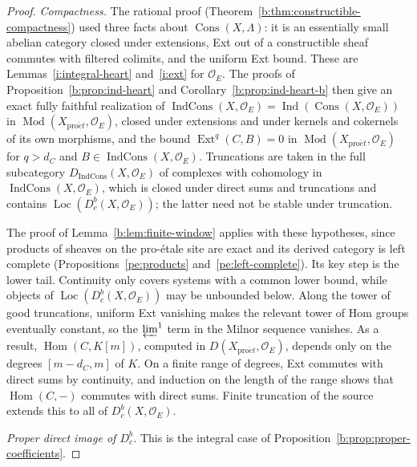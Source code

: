 \documentclass[11pt,a4paper]{article}
\numberwithin{equation}{section}
\theoremstyle{definition}
\theoremstyle{remark}
\newcommand{\Dbc}{D^b_c}
\newcommand{\Mod}{\operatorname{Mod}}
\newcommand{\Loc}{\operatorname{Loc}}
\newcommand{\proet}{\mathrm{pro}\acute{e}t}
\newcommand{\Hom}{\operatorname{Hom}}
\newcommand{\Ext}{\operatorname{Ext}}
\newcommand{\Cons}{\operatorname{Cons}}
\newcommand{\IndCons}{\operatorname{IndCons}}
\newcommand{\Dic}{D_{\IndCons}}
\begin{document}
\begin{proof}
\emph{Compactness.} The rational proof
(Theorem~\ref{b:thm:constructible-compactness}) used three facts about
$\Cons(X,\Lambda)$: it is an essentially small abelian category closed
under extensions, Ext out of a constructible sheaf commutes with
filtered colimits, and the uniform Ext bound. These are
Lemmas~\ref{i:integral-heart} and~\ref{i:ext} for $\mathcal O_E$. The
proofs of Proposition~\ref{b:prop:ind-heart} and
Corollary~\ref{b:prop:ind-heart-b} then give an exact fully faithful
realization of $\IndCons(X,\mathcal O_E)=\operatorname{Ind}(\Cons(X,\mathcal O_E))$
in $\Mod(X_{\proet},\mathcal O_E)$, closed under extensions and under
kernels and cokernels of its own morphisms, and the bound
$\Ext^q(C,B)=0$ in $\Mod(X_{\proet},\mathcal O_E)$ for $q>d_C$ and $B\in\IndCons(X,\mathcal O_E)$. Truncations are taken in the full
subcategory $\Dic(X,\mathcal O_E)$ of complexes with cohomology in
$\IndCons(X,\mathcal O_E)$, which is closed under direct sums and
truncations and contains $\Loc(\Dbc(X,\mathcal O_E))$; the latter need
not be stable under truncation.

The proof of Lemma~\ref{b:lem:finite-window} applies with these
hypotheses, since products of sheaves on the pro-\'etale site are exact
and its derived category is left complete
(Propositions~\ref{pe:products} and~\ref{pe:left-complete}). Its key step
is the lower tail. Continuity only covers systems with a common lower
bound, while objects of $\Loc(\Dbc(X,\mathcal O_E))$ may be unbounded
below. Along the tower of good truncations, uniform Ext vanishing makes
the relevant tower of Hom groups eventually constant, so the
$\varprojlim^1$ term in the Milnor sequence vanishes. As a result,
$\Hom(C,K[m])$, computed in $D(X_{\proet},\mathcal O_E)$, depends only on the degrees $[m-d_C,m]$ of $K$. On a
finite range of degrees, Ext commutes with direct sums by continuity,
and induction on the length of the range shows that $\Hom(C,-)$ commutes
with direct sums. Finite truncation of the source extends this to all of
$\Dbc(X,\mathcal O_E)$.

\emph{Proper direct image of $\Dbc$.} This is the integral case of
Proposition~\ref{b:prop:proper-coefficients}.


\end{proof}
\end{document}
